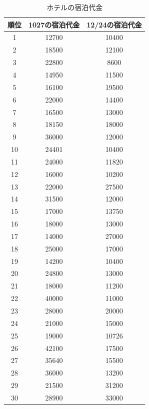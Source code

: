 \documentclass[11pt,a4j]{jsarticle}
\begin{document}
\begin{table}[H]
  \caption{ホテルの宿泊代金}
  \label{tab:hotel1}
  \small
  \begin{center}
      \begin{tabular}{c|cc}
        \hline
        \toprule
        順位 & 1027の宿泊代金 & 12/24の宿泊代金 \\
        \midrule
        1	&	12700	&	10400	\\
        2	&	18500	&	12100	\\
        3	&	22800	&	8600	\\
        4	&	14950	&	11500	\\
        5	&	16100	&	19500	\\
        6	&	22000	&	14400	\\
        7	&	16500	&	13000	\\
        8	&	18150	&	18000	\\
        9	&	36000	&	12000	\\
        10	&	24401	&	10400	\\
        11	&	24000	&	11820	\\
        12	&	16000	&	10200	\\
        13	&	22000	&	27500	\\
        14	&	31500	&	12000	\\
        15	&	17000	&	13750	\\
        16	&	18000	&	13000	\\
        17	&	14000	&	27000	\\
        18	&	25000	&	17000	\\
        19	&	14200	&	10400	\\
        20	&	24800	&	13000	\\
        21	&	18000	&	11200	\\
        22	&	40000	&	11000	\\
        23	&	28000	&	20000	\\
        24	&	21000	&	15000	\\
        25	&	19000	&	10726	\\
        26	&	42100	&	17500	\\
        27	&	35640	&	15500	\\
        28	&	36000	&	13200	\\
        29	&	21500	&	31200	\\
        30	&	28900	&	33000	\\
        \hline
      \end{tabular}
  \end{center}
\end{table}
\end{document}
